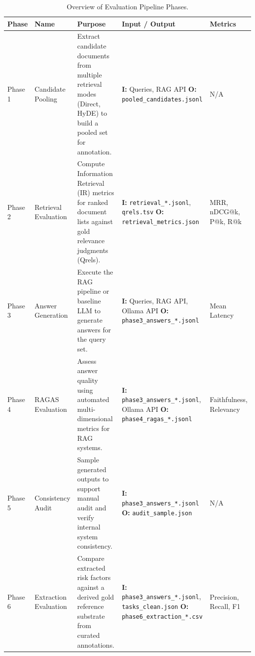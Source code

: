 \begin{table}[htbp]
\centering
\caption{Overview of Evaluation Pipeline Phases.}
\label{tab:evaluation-phases}
\scriptsize
\begin{tabularx}{\textwidth}{l >{\raggedright\arraybackslash}p{2cm} X >{\raggedright\arraybackslash}p{3.8cm} >{\raggedright\arraybackslash}p{1.8cm}}
\toprule
Phase & Name & Purpose & Input / Output & Metrics \\
\midrule
Phase 1 & Candidate Pooling & Extract candidate documents from multiple retrieval modes (Direct, HyDE) to build a pooled set for annotation. & \textbf{I:} Queries, RAG API \newline \textbf{O:} \texttt{pooled\_candidates.jsonl} & N/A \\
Phase 2 & Retrieval Evaluation & Compute Information Retrieval (IR) metrics for ranked document lists against gold relevance judgments (Qrels). & \textbf{I:} \texttt{retrieval\_*.jsonl}, \texttt{qrels.tsv} \newline \textbf{O:} \texttt{retrieval\_metrics.json} & MRR, nDCG@k, P@k, R@k \\
Phase 3 & Answer Generation & Execute the RAG pipeline or baseline LLM to generate answers for the query set. & \textbf{I:} Queries, RAG API, Ollama API \newline \textbf{O:} \texttt{phase3\_answers\_*.jsonl} & Mean Latency \\
Phase 4 & RAGAS Evaluation & Assess answer quality using automated multi-dimensional metrics for RAG systems. & \textbf{I:} \texttt{phase3\_answers\_*.jsonl}, Ollama API \newline \textbf{O:} \texttt{phase4\_ragas\_*.jsonl} & Faithfulness, Relevancy \\
Phase 5 & Consistency Audit & Sample generated outputs to support manual audit and verify internal system consistency. & \textbf{I:} \texttt{phase3\_answers\_*.jsonl} \newline \textbf{O:} \texttt{audit\_sample.json} & N/A \\
Phase 6 & Extraction Evaluation & Compare extracted risk factors against a derived gold reference substrate from curated annotations. & \textbf{I:} \texttt{phase3\_answers\_*.jsonl}, \texttt{tasks\_clean.json} \newline \textbf{O:} \texttt{phase6\_extraction\_*.csv} & Precision, Recall, F1 \\
\bottomrule
\end{tabularx}
\end{table}

